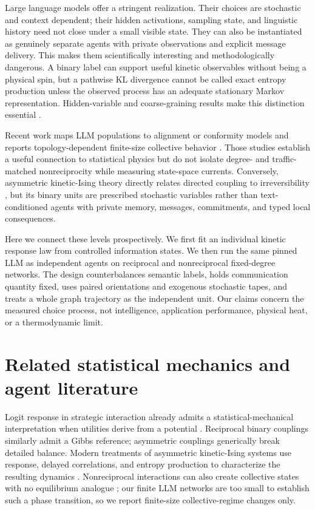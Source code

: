 \documentclass[12pt]{article}
\begin{document}
Large language models offer a stringent realization. Their choices are
stochastic and context dependent; their hidden activations, sampling state, and
linguistic history need not close under a small visible state. They can also be
instantiated as genuinely separate agents with private observations and
explicit message delivery. This makes them scientifically interesting and
methodologically dangerous. A binary label can support useful kinetic
observables without being a physical spin, but a pathwise KL divergence cannot
be called exact entropy production unless the observed process has an adequate
stationary Markov representation. Hidden-variable and coarse-graining results
make this distinction essential \cite{kawaguchi2013,roldan2012,skinner2021}.

Recent work maps LLM populations to alignment or conformity models and reports
topology-dependent finite-size collective behavior
\cite{han2026,denobili2026,okawa2026}. Those studies establish a useful
connection to statistical physics but do not isolate degree- and
traffic-matched nonreciprocity while measuring state-space currents. Conversely,
asymmetric kinetic-Ising theory directly relates directed coupling to
irreversibility \cite{aguilera2021,zhang2023,dicarlo2025}, but its binary units
are prescribed stochastic variables rather than text-conditioned agents with
private memory, messages, commitments, and typed local consequences.

Here we connect these levels prospectively. We first fit an individual kinetic
response law from controlled information states. We then run the same pinned
LLM as independent agents on reciprocal and nonreciprocal fixed-degree networks.
The design counterbalances semantic labels, holds communication quantity fixed,
uses paired orientations and exogenous stochastic tapes, and treats a whole
graph trajectory as the independent unit. Our claims concern the measured
choice process, not intelligence, application performance, physical heat, or a
thermodynamic limit.

\section{Related statistical mechanics and agent literature}

Logit response in strategic interaction already admits a statistical-mechanical
interpretation when utilities derive from a potential \cite{blume1993}.
Reciprocal binary couplings similarly admit a Gibbs reference; asymmetric
couplings generically break detailed balance. Modern treatments of asymmetric
kinetic-Ising systems use response, delayed correlations, and entropy production
to characterize the resulting dynamics \cite{aguilera2021}. Nonreciprocal
interactions can also create collective states with no equilibrium analogue
\cite{fruchart2021}; our finite LLM networks are too small to establish such a
phase transition, so we report finite-size collective-regime changes only.
\end{document}
